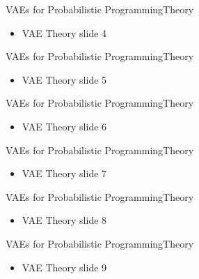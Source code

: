 \documentclass[AERbeamer%
              ,optEnglish%
              ,optBiber%
              ,optBibstyleAlphabetic%
              ,optBeamerClassicFormat%
              ]{AERlatex}%
\begin{document}
\begin{frame}[c]{VAEs for Probabilistic Programming}{Theory}
    \centering
    \begin{itemize}
        \item VAE Theory slide 4
    \end{itemize}
\end{frame}


\begin{frame}[c]{VAEs for Probabilistic Programming}{Theory}
    \centering
    \begin{itemize}
        \item VAE Theory slide 5
    \end{itemize}
\end{frame}


\begin{frame}[c]{VAEs for Probabilistic Programming}{Theory}
    \centering
    \begin{itemize}
        \item VAE Theory slide 6
    \end{itemize}
\end{frame}


\begin{frame}[c]{VAEs for Probabilistic Programming}{Theory}
    \centering
    \begin{itemize}
        \item VAE Theory slide 7
    \end{itemize}
\end{frame}


\begin{frame}[c]{VAEs for Probabilistic Programming}{Theory}
    \centering
    \begin{itemize}
        \item VAE Theory slide 8
    \end{itemize}
\end{frame}


\begin{frame}[c]{VAEs for Probabilistic Programming}{Theory}
    \centering
    \begin{itemize}
        \item VAE Theory slide 9
    \end{itemize}
\end{frame}
\end{document}

